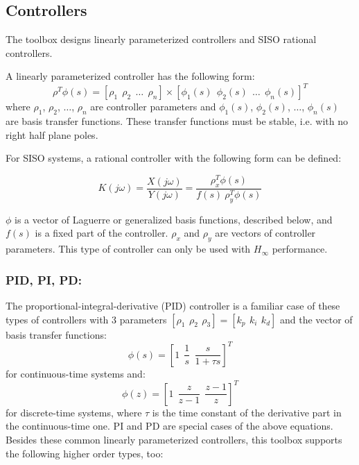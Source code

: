 \documentclass [12pt , a4paper] {report}
\begin{document}
\subsection{Controllers}

The toolbox designs linearly parameterized controllers and SISO rational controllers.

A linearly parameterized controller has the following form:
\begin{equation}
\label{linparcon}
\rho^T \phi(s)=[\rho_1 \: \: \rho_2 \: \: \ldots \:\: \rho_n]\times [\phi_1(s) \: \: \phi_2(s) \:\: \ldots \:\: \phi_n(s)]^T
\end{equation}
where $\rho_1$, $\rho_2$, $\ldots$, $\rho_n$ are controller parameters and $\phi_1(s)$, $\phi_2(s)$, $\ldots$, $\phi_n(s)$ are basis transfer functions. These transfer functions must be stable, i.e. with no right half plane poles.

For SISO systems, a rational controller with the following form can be defined:

\begin{equation}
    K(j\omega) = \frac{X(j\omega)}{Y(j\omega)} = \frac{\rho_x^T \phi (s)}{f(s) \ \rho_y^T \phi (s)}
\end{equation}

$\phi$ is a vector of Laguerre or generalized basis functions, described below, and $f(s)$ is a fixed part of the controller. $\rho_x$ and $\rho_y$ are vectors of controller parameters. This type of controller can only be used with $H_\infty$ performance.

\subsubsection{PID, PI, PD:}

The proportional-integral-derivative (PID) controller is a familiar case of these types of controllers with 3 parameters $[\rho_1 \:\, \rho_2 \:\, \rho_3]=[k_p \:\, k_i \:\, k_d]$ and the vector of basis transfer functions:
\begin{equation}
\phi (s)=[1 \:\: \frac{1}{s} \:\: \frac{s}{1+\tau s}]^T
\end{equation}
for continuous-time systems and:
\begin{equation}
\phi (z)=[1 \:\: \frac{z}{z-1} \:\: \frac{z-1}{z}]^T 
\end{equation}
for discrete-time systems, where $\tau$ is the time constant of the derivative part in the continuous-time one. PI and PD are special cases of the above equations. Besides these common linearly parameterized controllers, this toolbox supports the following higher order types, too: 
\end{document}
